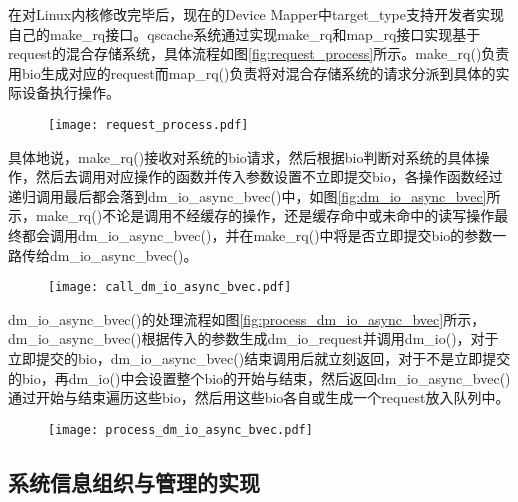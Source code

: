在对Linux内核修改完毕后，现在的Device Mapper中target\_type支持开发者实现自己的make\_rq接口。qscache系统通过实现make\_rq和map\_rq接口实现基于request的混合存储系统，具体流程如图\ref{fig:request_process}所示。make\_rq()负责用bio生成对应的request而map\_rq()负责将对混合存储系统的请求分派到具体的实际设备执行操作。

\begin{figure}[!htbp]
    \centering
    \texttt{[image: request\_process.pdf]}

    \vskip -1cm

\end{figure}

具体地说，make\_rq()接收对系统的bio请求，然后根据bio判断对系统的具体操作，然后去调用对应操作的函数并传入参数设置不立即提交bio，各操作函数经过递归调用最后都会落到dm\_io\_async\_bvec()中，如图\ref{fig:dm_io_async_bvec}所示，make\_rq()不论是调用不经缓存的操作，还是缓存命中或未命中的读写操作最终都会调用dm\_io\_async\_bvec()，并在make\_rq()中将是否立即提交bio的参数一路传给dm\_io\_async\_bvec()。

\begin{figure}[H]
    \centering
    \texttt{[image: call\_dm\_io\_async\_bvec.pdf]}
\end{figure}

dm\_io\_async\_bvec()的处理流程如图\ref{fig:process_dm_io_async_bvec}所示，dm\_io\_async\_bvec()根据传入的参数生成dm\_io\_request并调用dm\_io()，对于立即提交的bio，dm\_io\_async\_bvec()结束调用后就立刻返回，对于不是立即提交的bio，再dm\_io()中会设置整个bio的开始与结束，然后返回dm\_io\_async\_bvec()通过开始与结束遍历这些bio，然后用这些bio各自或生成一个request放入队列中。

\begin{figure}[H]
    \centering
    \texttt{[image: process\_dm\_io\_async\_bvec.pdf]}
\end{figure}

\subsection{系统信息组织与管理的实现}

